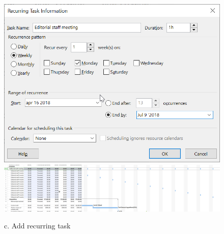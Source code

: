 \documentclass[runningheads]{llncs}
\begin{document}
\begin{figure}[H]
    \centering
    \includegraphics[width=1.0\textwidth]{image/f2c1}
    \includegraphics[width=1.0\textwidth]{image/f2c2}
    \caption{c. Add recurring task}
\end{figure}
\end{document}
